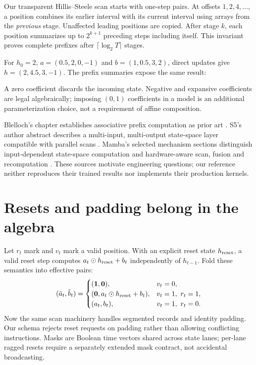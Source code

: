 Our transparent Hillis--Steele scan starts with one-step pairs. At offsets
$1,2,4,\ldots$, a position combines its earlier interval with its current interval
using arrays from the \emph{previous} stage. Unaffected leading positions are copied.
After stage $k$, each position summarizes up to $2^{k+1}$ preceding steps including
itself. This invariant proves complete prefixes after $\lceil\log_2T\rceil$ stages.

For $h_0=2$, $a=(0.5,2,0,-1)$ and $b=(1,0.5,3,2)$, direct updates give
$h=(2,4.5,3,-1)$. The prefix summaries expose the same result:
\begin{center}\end{center}
A zero coefficient discards the incoming state. Negative and expansive coefficients
are legal algebraically; imposing $(0,1)$ coefficients in a model is an additional
parameterization choice, not a requirement of affine composition.

Blelloch's chapter establishes associative prefix computation as prior art
\cite{Blelloch1993}. S5's author abstract describes a multi-input, multi-output
state-space layer compatible with parallel scans \cite{Smith2023}. Mamba's selected
mechanism sections distinguish input-dependent state-space computation and
hardware-aware scan, fusion and recomputation \cite{GuDao2024}. These sources
motivate engineering questions; our reference neither reproduces their trained
results nor implements their production kernels.

\section{Resets and padding belong in the algebra}
Let $r_t$ mark  and $v_t$ mark a valid position. With an explicit
reset state $h_{\rm reset}$, a valid reset step computes
$a_t\odot h_{\rm reset}+b_t$ independently of $h_{t-1}$.
Fold these semantics into effective pairs:
\[
(\tilde a_t,\tilde b_t)=
\begin{cases}
(\mathbf1,\mathbf0),&v_t=0,\\
(\mathbf0,a_t\odot h_{\rm reset}+b_t),&v_t=1,\ r_t=1,\\
(a_t,b_t),&v_t=1,\ r_t=0.
\end{cases}
\]
Now the same scan machinery handles segmented records and identity padding.
Our schema rejects reset requests on padding rather than allowing conflicting
instructions. Masks are Boolean time vectors shared across state lanes; per-lane
ragged resets require a separately extended mask contract, not accidental broadcasting.

